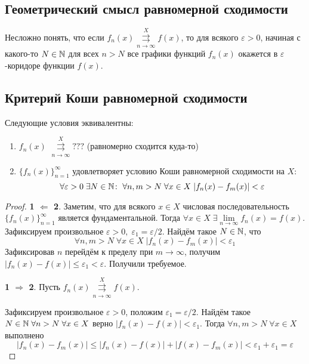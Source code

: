 \documentclass[a4paper, 12pt]{article}
\begin{document}
	\subsection{Геометрический смысл равномерной сходимости}
	Несложно понять, что если $f_n(x) \overset{X}{\underset{n\to\infty}{\rightrightarrows}} f(x)$, то для всякого $\varepsilon > 0$, начиная с какого-то $N\in \mathbb{N}$ для всех $n>N$ все графики функций $f_n(x)$ окажется в $\varepsilon$-коридоре функции $f(x)$.
	\subsection{Критерий Коши равномерной сходимости}
	\begin{Theorem}
		Следующие условия эквивалентны:
		\begin{enumerate}
			\item $f_n(x)$ $\overset{X}{\underset{n\to\infty}{\rightrightarrows}} ???$ (равномерно сходится куда-то)
			\item $\{f_n(x)\}_{n=1}^\infty$ удовлетворяет условию Коши равномерной сходимости на $X$:
			$$
			\forall \varepsilon > 0\; \exists N\in\mathbb{N}\colon \; \forall n,m>N\; \forall x\in X\; |f_n(x) - f_m(x)| < \varepsilon
			$$
		\end{enumerate}
	\end{Theorem}
	\begin{proof}
		\par \textbf{1 $\Leftarrow$ 2}. Заметим, что для всякого $x\in X$ числовая последовательность $\{f_n(x)\}_{n=1}^\infty$ является фундаментальной. Тогда $\forall x\in X\; \exists \lim\limits_{n\to \infty} f_n(x) = f(x)$. Зафиксируем произвольное $\varepsilon > 0,\; \varepsilon_1 = \varepsilon / 2$. Найдём такое $N \in \mathbb{N}$, что 
		$$
			\forall n,m>N\; \forall x\in X\; |f_n(x) - f_m(x)| < \varepsilon_1
		$$
		Зафиксировав $n$ перейдём к пределу при $m \to \infty$, получим $|f_n(x) - f(x)| \leqslant \varepsilon_1 < \varepsilon$. Получили требуемое.
		\par \textbf{1 $\Rightarrow$ 2}. Пусть $f_n(x) \overset{X}{\underset{n\to\infty}{\rightrightarrows}} f(x)$.
		\par Зафиксируем произвольное $\varepsilon > 0$, положим $\varepsilon_1 = \varepsilon / 2$. Найдём такое $N\in \mathbb{N}\; \forall n>N\; \forall x\in X$ верно $ |f_n(x) - f(x)| < \varepsilon_1$. Тогда $\forall n,m > N\; \forall x \in X$ выполнено
		$$
			|f_n(x) - f_m(x)| \leqslant |f_n(x) - f(x)| + |f(x) - f_m(x)| < \varepsilon_1 + \varepsilon_1 = \varepsilon
		$$
	\end{proof}
\end{document}
